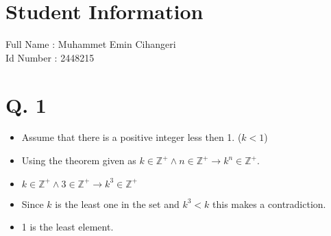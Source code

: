 \documentclass[11pt]{article}
\begin{document}
\section*{Student Information } 
Full Name : Muhammet Emin Cihangeri \\
Id Number : 2448215 \\



\section*{Q. 1}

\begin{itemize}
            \item Assume that there is a positive integer less then 1. ($ k < 1$)
	   \item Using the theorem given as $ k \in \mathbb{Z}^{+}  \wedge n \in \mathbb{Z}^{+} \rightarrow k^{n}  \in  \mathbb{Z}^{+} $.
	   \item $ k \in \mathbb{Z}^{+}  \wedge 3 \in \mathbb{Z}^{+} \rightarrow k^{3}  \in  \mathbb{Z}^{+} $
	   \item Since $k$ is the least one in the set and $ k^{3} < k $ this makes a contradiction.
	   \item 1 is the least element.
        \end{itemize}{}
\end{document}
